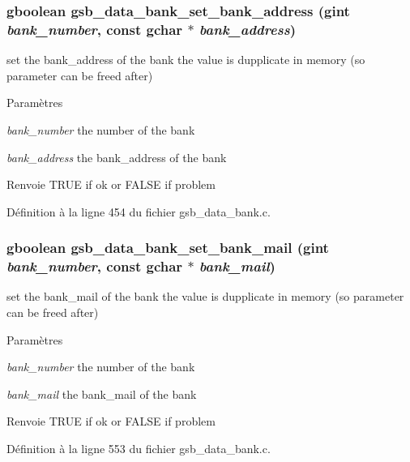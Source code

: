 \subsubsection[{gsb\_\-data\_\-bank\_\-set\_\-bank\_\-address}]{\setlength{\rightskip}{0pt plus 5cm}gboolean gsb\_\-data\_\-bank\_\-set\_\-bank\_\-address (gint {\em bank\_\-number}, \/  const gchar $\ast$ {\em bank\_\-address})}\label{gsb__data__bank_8c_afa3fbafdb2909d1f31b9966e0c09c28f}
set the bank\_\-address of the bank the value is dupplicate in memory (so parameter can be freed after)


\begin{DoxyParams}{Paramètres}
\item[{\em bank\_\-number}]the number of the bank \item[{\em bank\_\-address}]the bank\_\-address of the bank\end{DoxyParams}
\begin{DoxyReturn}{Renvoie}
TRUE if ok or FALSE if problem 
\end{DoxyReturn}


Définition à la ligne 454 du fichier gsb\_\-data\_\-bank.c.

\subsubsection[{gsb\_\-data\_\-bank\_\-set\_\-bank\_\-mail}]{\setlength{\rightskip}{0pt plus 5cm}gboolean gsb\_\-data\_\-bank\_\-set\_\-bank\_\-mail (gint {\em bank\_\-number}, \/  const gchar $\ast$ {\em bank\_\-mail})}\label{gsb__data__bank_8c_a83aede078ed8c5b81800e39e1068fab0}
set the bank\_\-mail of the bank the value is dupplicate in memory (so parameter can be freed after)


\begin{DoxyParams}{Paramètres}
\item[{\em bank\_\-number}]the number of the bank \item[{\em bank\_\-mail}]the bank\_\-mail of the bank\end{DoxyParams}
\begin{DoxyReturn}{Renvoie}
TRUE if ok or FALSE if problem 
\end{DoxyReturn}


Définition à la ligne 553 du fichier gsb\_\-data\_\-bank.c.

